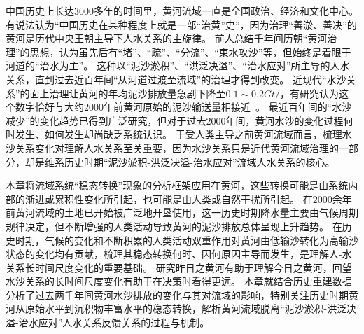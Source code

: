 

中国历史上长达3000多年的时间里，黄河流域一直是全国政治、经济和文化中心。
有说法认为“中国历史在某种程度上就是一部“治黄”史”，因为治理“善淤、善决”的黄河是历代中央王朝主导下人水关系的主旋律。
前人总结千年间历朝“黄河治理”的思想，认为虽先后有“堵”、“疏”、“分流”、“束水攻沙”等，但始终是着眼于河道的“治水为主”\cite{WangWeiJing2009}。
这种以“泥沙淤积”、“洪泛决溢”、“治水应对”所主导的人水关系，直到过去近百年间“从河道过渡至流域”的治理才得到改变。
近现代“水沙关系”的面上治理让黄河的年均泥沙排放量急剧下降至$0.1\sim0.2 Gt/$，有研究认为这个数字恰好与大约$2000$年前黄河原始的泥沙输送量相接近~\cite{wang2007}。
最近百年间的“水沙减少”的变化趋势已得到广泛研究\cite{wei2016, song2020, wang2016a}，但对于过去$2000$年间，黄河水沙的变化过程何时发生、如何发生却尚缺乏系统认识。
于受人类主导之前黄河流域而言，梳理水沙关系变化对理解人水关系至关重要，因为水沙关系只是近代黄河流域治理的一部分，却是维系历史时期“泥沙淤积-洪泛决溢-治水应对”流域人水关系的核心。


本章将流域系统“稳态转换”现象的分析框架应用在黄河，这些转换可能是由系统内部的渐进或累积性变化所引起，也可能是由人类或自然干扰所引起。
在$2000$余年前黄河流域的土地已开始被广泛地开垦使用，这一历史时期降水量主要由气候周期规律决定，但不断增强的人类活动导致黄河的泥沙排放总体呈现上升趋势\cite{wang2007}。
在历史时期，气候的变化和不断积累的人类活动双重作用对黄河由低输沙转化为高输沙状态的变化均有贡献，梳理其稳态转换何时、因何原因主导而发生，是理解人-水关系长时间尺度变化的重要基础。
研究昨日之黄河有助于理解今日之黄河，回望水沙关系的长时间尺度变化有助于在决策时看得更远。
本章就结合历史重建数据分析了过去两千年间黄河水沙排放的变化与其对流域的影响，特别关注历史时期黄河从原始水平到沉积物丰富水平的稳态转换，解析黄河流域脱离“泥沙淤积-洪泛决溢-治水应对”人水关系反馈关系的过程与机制。

